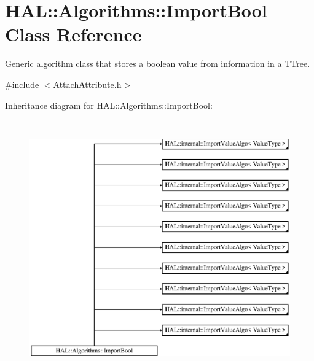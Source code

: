 \hypertarget{class_h_a_l_1_1_algorithms_1_1_import_bool}{\section{H\+A\+L\+:\+:Algorithms\+:\+:Import\+Bool Class Reference}
\label{class_h_a_l_1_1_algorithms_1_1_import_bool}
}


Generic algorithm class that stores a boolean value from information in a T\+Tree.  




{\ttfamily \#include $<$Attach\+Attribute.\+h$>$}

Inheritance diagram for H\+A\+L\+:\+:Algorithms\+:\+:Import\+Bool\+:\begin{figure}[H]
\begin{center}
\leavevmode
\includegraphics[height=11.000000cm]{class_h_a_l_1_1_algorithms_1_1_import_bool}
\end{center}
\end{figure}
